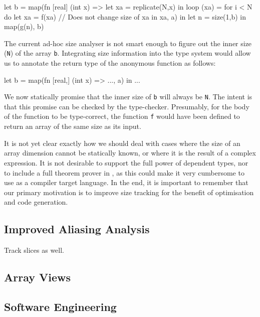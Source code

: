 \begin{colorcode}
let b = map(fn [real] (int x) =>
              let xa = replicate(N,x) in
              loop (xa) = for i < N do
                let xa = f(xa) // Does not change size of xa
                in
              xa,
            a) in
let n = size(1,b) in
map(g(n), b)
\end{colorcode}

The current ad-hoc size analyser is not smart enough to figure out the
inner size (\texttt{N}) of the array \texttt{b}.  Integrating size
information into the type system would allow us to annotate the return
type of the anonymous function as follows:

\begin{colorcode}
let b = map(fn [real,] (int x) =>
              ...,
            a) in
...
\end{colorcode}

We now statically promise that the inner size of \texttt{b} will
always be \texttt{N}.  The intent is that this promise can be checked
by the type-checker.  Presumably, for the body of the function to be
type-correct, the function \texttt{f} would have been defined to
return an array of the same size as its input.

It is not yet clear exactly how we should deal with cases where the
size of an array dimension cannot be statically known, or where it is
the result of a complex expression.  It is not desirable to support
the full power of dependent types, nor to include a full theorem
prover in \LO{}, as this could make it very cumbersome to use \LO{} as
a compiler target language.  In the end, it is important to remember
that our primary motivation is to improve size tracking for the
benefit of optimisation and code generation.


\subsection{Improved Aliasing Analysis}

Track slices as well.

\subsection{Array Views}

\subsection{Software Engineering}

